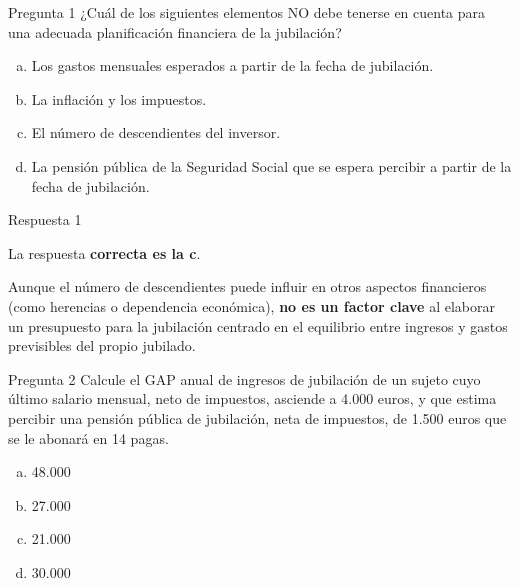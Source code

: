 \documentclass[
  ignorenonframetext,
  aspectratio=54,
  spanish,
]{beamer}
\providecommand{\tightlist}{%
  \setlength{\itemsep}{0pt}\setlength{\parskip}{0pt}}
\begin{document}
\begin{frame}{Pregunta 1}
\label{pregunta-1}
¿Cuál de los siguientes elementos NO debe tenerse en cuenta para una
adecuada planificación financiera de la jubilación?

\begin{enumerate}
[a.]
\tightlist
\item
  Los gastos mensuales esperados a partir de la fecha de jubilación.
\item
  La inflación y los impuestos.
\item
  El número de descendientes del inversor.
\item
  La pensión pública de la Seguridad Social que se espera percibir a
  partir de la fecha de jubilación.
\end{enumerate}
\end{frame}

\begin{frame}{Respuesta 1}
\label{respuesta-1}
\begin{tcolorbox}[enhanced jigsaw, rightrule=.15mm, colback=white, arc=.35mm, colframe=quarto-callout-tip-color-frame, leftrule=.75mm, bottomrule=.15mm, left=2mm, toprule=.15mm, opacityback=0, breakable]
\begin{minipage}[t]{5.5mm}
\textcolor{quarto-callout-tip-color}{\faLightbulb}
\end{minipage}%
\begin{minipage}[t]{\textwidth - 5.5mm}

La respuesta \textbf{correcta es la c}.

Aunque el número de descendientes puede influir en otros aspectos
financieros (como herencias o dependencia económica), \textbf{no es un
factor clave} al elaborar un presupuesto para la jubilación centrado en
el equilibrio entre ingresos y gastos previsibles del propio jubilado.

\end{minipage}%
\end{tcolorbox}
\end{frame}

\begin{frame}{Pregunta 2}
\label{pregunta-2}
Calcule el GAP anual de ingresos de jubilación de un sujeto cuyo último
salario mensual, neto de impuestos, asciende a 4.000 euros, y que estima
percibir una pensión pública de jubilación, neta de impuestos, de 1.500
euros que se le abonará en 14 pagas.

\begin{enumerate}
[a.]
\tightlist
\item
  48.000
\item
  27.000
\item
  21.000
\item
  30.000
\end{enumerate}
\end{frame}
\end{document}
